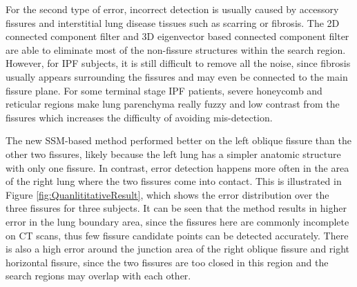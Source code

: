 {For the second type of error, incorrect detection is usually caused by accessory fissures and interstitial lung disease tissues such as scarring or fibrosis. The 2D connected component filter and 3D eigenvector based connected component filter are able to eliminate most of the non-fissure structures within the search region. However, for IPF subjects, it is still difficult to remove all the noise, since fibrosis usually appears surrounding the fissures and may even be connected to the main fissure plane. For some terminal stage IPF patients, severe honeycomb and reticular regions make lung parenchyma really fuzzy and low contrast from the fissures which increases the difficulty of avoiding mis-detection.

The new SSM-based method performed better on the left oblique fissure than the other two fissures, likely because the left lung has a simpler anatomic structure with only one fissure. In contrast, error detection happens more often in the area of the right lung where the two fissures come into contact. This is illustrated in Figure \ref{fig:QuanlititativeResult}, which shows the error distribution over the three fissures for three subjects. It can be seen that the method results in higher error in the lung boundary area, since the fissures here are commonly incomplete on CT scans, thus few fissure candidate points can be detected accurately. There is also a high error around the junction area of the right oblique fissure and right horizontal fissure, since the two fissures are too closed in this region and the search regions may overlap with each other.

}
